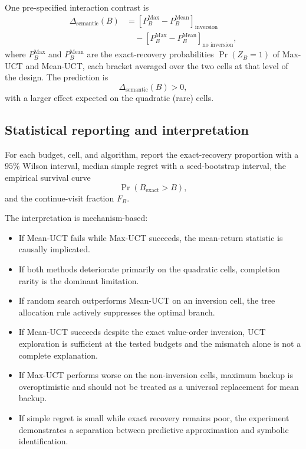 \documentclass[11pt, a4paper]{article}
\theoremstyle{definition}
\begin{document}
One pre-specified interaction contrast is
\begin{align}
    \Delta_{\mathrm{semantic}}(B)
    &=
    \left[
        P_B^{\mathrm{Max}}-P_B^{\mathrm{Mean}}
    \right]_{\text{inversion}}
    \nonumber\\
    &\quad -
    \left[
        P_B^{\mathrm{Max}}-P_B^{\mathrm{Mean}}
    \right]_{\text{no inversion}},
    \label{eq:semantic-interaction}
\end{align}
where \(P_B^{\mathrm{Max}}\) and \(P_B^{\mathrm{Mean}}\) are the
exact-recovery probabilities \(\Pr(Z_B=1)\) of Max-UCT and Mean-UCT, each
bracket averaged over the two cells at that level of the design.  The
prediction is
\[
    \Delta_{\mathrm{semantic}}(B)>0,
\]
with a larger effect expected on the quadratic (rare) cells.

\subsection{Statistical reporting and interpretation}

For each budget, cell, and algorithm, report the exact-recovery proportion
with a \(95\%\) Wilson interval, median simple regret with a seed-bootstrap
interval, the empirical survival curve
\[
    \Pr(B_{\mathrm{exact}}>B),
\]
and the continue-visit fraction \(F_B\).

The interpretation is mechanism-based:
\begin{itemize}
    \item If Mean-UCT fails while Max-UCT succeeds, the mean-return statistic
    is causally implicated.
    \item If both methods deteriorate primarily on the quadratic cells,
    completion rarity is the dominant limitation.
    \item If random search outperforms Mean-UCT on an inversion cell, the
    tree allocation rule actively suppresses the optimal branch.
    \item If Mean-UCT succeeds despite the exact value-order inversion, UCT
    exploration is sufficient at the tested budgets and the mismatch alone is
    not a complete explanation.
    \item If Max-UCT performs worse on the non-inversion cells, maximum backup is
    overoptimistic and should not be treated as a universal replacement for
    mean backup.
    \item If simple regret is small while exact recovery remains poor, the
    experiment demonstrates a separation between predictive approximation
    and symbolic identification.
\end{itemize}
\end{document}
